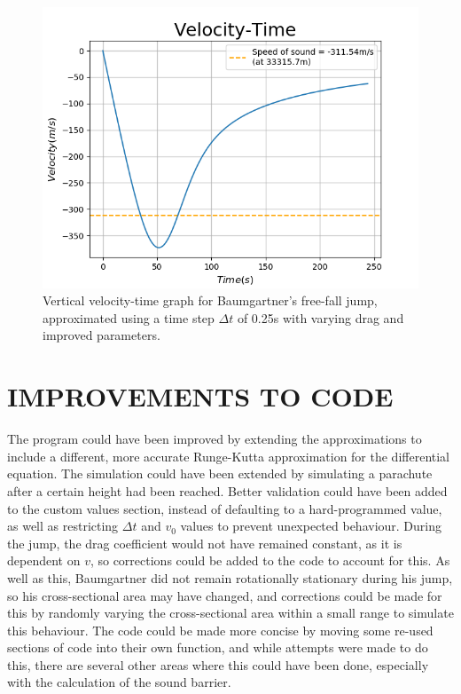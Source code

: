 \documentclass[twocolumn,prl,nobalancelastpage,aps,10pt]{revtex4-1}
\begin{document}
\begin{figure}[H]
	\includegraphics*[width=0.96\linewidth,clip]{Baumgartner-vt2}
	\caption{Vertical velocity-time graph for Baumgartner's free-fall jump, approximated using a time step $\Delta t$ of 0.25s with varying drag and improved parameters.}\label{Baumgartner-vt2}
\end{figure}

\section{IMPROVEMENTS TO CODE}

The program could have been improved by extending the approximations to include a different, more accurate Runge-Kutta approximation for the differential equation. The simulation could have been extended by simulating a parachute after a certain height had been reached. Better validation could have been added to the custom values section, instead of defaulting to a hard-programmed value, as well as restricting $\Delta t$ and $v_{0}$ values to prevent unexpected behaviour. During the jump, the drag coefficient would not have remained constant, as it is dependent on $v$, so corrections could be added to the code to account for this. As well as this, Baumgartner did not remain rotationally stationary during his jump, so his cross-sectional area may have changed, and corrections could be made for this by randomly varying the cross-sectional area within a small range to simulate this behaviour. The code could be made more concise by moving some re-used sections of code into their own function, and while attempts were made to do this, there are several other areas where this could have been done, especially with the calculation of the sound barrier.
\end{document}
